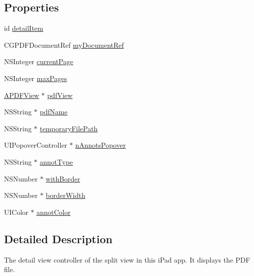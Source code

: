 \subsection*{Properties}
\begin{DoxyCompactItemize}
\item 
id \hyperlink{interface_a_p_d_f_detail_view_controller_af25271202cf1177a41928066d6cd849a}{detail\-Item}
\item 
C\-G\-P\-D\-F\-Document\-Ref \hyperlink{interface_a_p_d_f_detail_view_controller_a46c3fb7500d16940beb2097e6674af7a}{my\-Document\-Ref}
\item 
N\-S\-Integer \hyperlink{interface_a_p_d_f_detail_view_controller_af025d28bbcd266b1a1837d6ad486532c}{current\-Page}
\item 
N\-S\-Integer \hyperlink{interface_a_p_d_f_detail_view_controller_a2da3cbd8452ab98417155110f0a18294}{max\-Pages}
\item 
\hyperlink{interface_a_p_d_f_view}{A\-P\-D\-F\-View} $\ast$ \hyperlink{interface_a_p_d_f_detail_view_controller_aaf490f765a72dd330a26ec4f486bfba1}{pdf\-View}
\item 
N\-S\-String $\ast$ \hyperlink{interface_a_p_d_f_detail_view_controller_aa63fcfba604fa748fa5127694451a916}{pdf\-Name}
\item 
N\-S\-String $\ast$ \hyperlink{interface_a_p_d_f_detail_view_controller_a7e73dd19df5ed6dedebde35c9901a164}{temporary\-File\-Path}
\item 
U\-I\-Popover\-Controller $\ast$ \hyperlink{interface_a_p_d_f_detail_view_controller_a332bcd4a064cfa95fc63527f3d5d474e}{n\-Annots\-Popover}
\item 
N\-S\-String $\ast$ \hyperlink{interface_a_p_d_f_detail_view_controller_ab0d6f6ced6de7445c5b83d7ebd485c4a}{annot\-Type}
\item 
N\-S\-Number $\ast$ \hyperlink{interface_a_p_d_f_detail_view_controller_a33508d1d7f1b1c686a4e5ab69f56a6de}{with\-Border}
\item 
N\-S\-Number $\ast$ \hyperlink{interface_a_p_d_f_detail_view_controller_a27b7494e7ec68ccb9381691b77527035}{border\-Width}
\item 
U\-I\-Color $\ast$ \hyperlink{interface_a_p_d_f_detail_view_controller_a78759cc6d13deec4123f1932ab02526c}{annot\-Color}
\end{DoxyCompactItemize}


\subsection{Detailed Description}
The detail view controller of the split view in this i\-Pad app. It displays the P\-D\-F file. 

